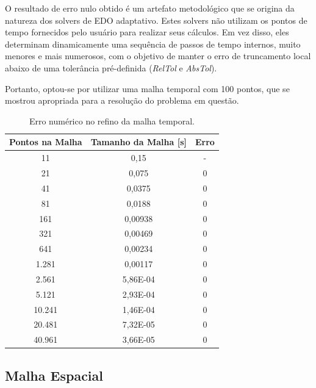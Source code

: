 O resultado de erro nulo obtido é um artefato metodológico que se origina da natureza dos solvers de EDO adaptativo. Estes solvers não utilizam os pontos de tempo fornecidos pelo usuário para realizar seus cálculos. Em vez disso, eles determinam dinamicamente uma sequência de passos de tempo internos, muito menores e mais numerosos, com o objetivo de manter o erro de truncamento local abaixo de uma tolerância pré-definida (\textit{RelTol} e \textit{AbsTol}). 

Portanto, optou-se por utilizar uma malha temporal com 100 pontos, que se mostrou apropriada para a resolução do problema em questão.

\begin{table}[H]
    \centering
    \caption{Erro numérico no refino da malha temporal.}
    \begin{tabular}{ccc}
        \textbf{Pontos na Malha} & \textbf{Tamanho da Malha {[}s{]}} & \textbf{Erro} \\ \hline
        11     & 0,15     & - \\
        21     & 0,075    & 0 \\
        41     & 0,0375   & 0 \\
        81     & 0,0188   & 0 \\
        161    & 0,00938  & 0 \\
        321    & 0,00469  & 0 \\
        641    & 0,00234  & 0 \\
        1.281  & 0,00117  & 0 \\
        2.561  & 5,86E-04 & 0 \\
        5.121  & 2,93E-04 & 0 \\
        10.241 & 1,46E-04 & 0 \\
        20.481 & 7,32E-05 & 0 \\
        40.961 & 3,66E-05 & 0  
    \end{tabular}
    \label{tab:error_in_the_temporal_mesh}
\end{table}


\subsection{Malha Espacial}


